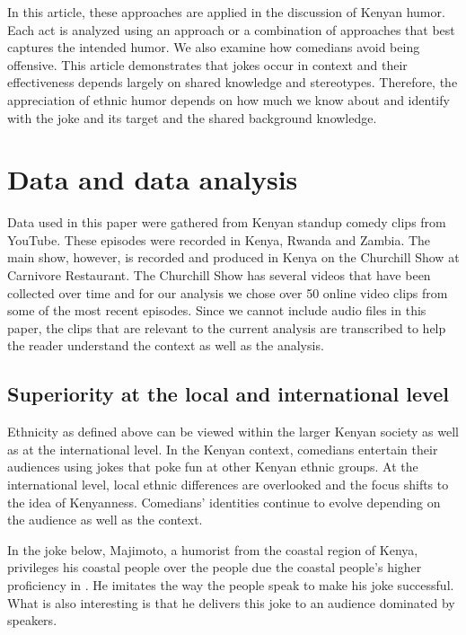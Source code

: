 \documentclass[output=paper]{langsci/langscibook}
\begin{document}
In this article, these approaches are applied in the discussion of Kenyan humor. Each act is analyzed using an approach or a combination of approaches that best captures the intended humor. We also examine how comedians avoid being offensive. This article demonstrates that jokes occur in context and their effectiveness depends largely on shared knowledge and stereotypes. Therefore, the appreciation of ethnic humor depends on how much we know about and identify with the joke and its target and the shared background knowledge. 

\section{Data and data analysis}

Data used in this paper were gathered from Kenyan standup comedy clips from YouTube. These episodes were recorded in Kenya, Rwanda and Zambia. The main show, however, is recorded and produced in Kenya on the Churchill Show at Carnivore Restaurant. The Churchill Show has several videos that have been collected over time and for our analysis we chose over 50 online video clips from some of the most recent episodes. Since we cannot include audio files in this paper, the clips that are relevant to the current analysis are transcribed to help the reader understand the context as well as the analysis. 

\subsection{Superiority at the local and international level}

Ethnicity as defined above can be viewed within the larger Kenyan society as well as at the international level. In the Kenyan context, comedians entertain their audiences using jokes that poke fun at other Kenyan ethnic groups. At the international level, local ethnic differences are overlooked and the focus shifts to the idea of Kenyanness. Comedians’ identities continue to evolve depending on the audience as well as the context.

In the joke below, Majimoto, a humorist from the coastal region of Kenya, privileges his coastal people over the  people due the coastal people’s higher proficiency in . He imitates the way the  people speak  to make his joke successful. What is also interesting is that he delivers this joke to an audience dominated by  speakers.
 
\end{document}
